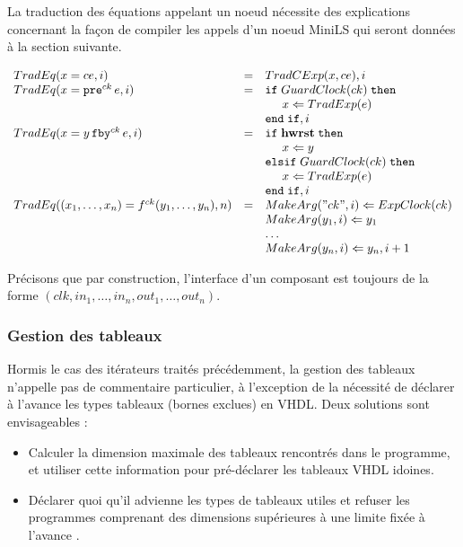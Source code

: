 \documentclass[a4paper]{article}
\newcommand{\mybox}[1]{\mbox{\tt{#1}}}
\newcommand{\ind}[0]{\hspace{0.5cm}}
\newcommand{\Fby}[2]{#1 \, \mybox{fby}^{ck} \, #2}
\newcommand{\Pre}[1]{\mybox{pre}^{ck} \, #1}
\newcommand{\App}[2]{#1^{ck}(#2)}
\newcommand{\Assign}[2]{#1 \Leftarrow #2}
\begin{document}
La traduction des \'equations appelant un noeud n\'ecessite des explications
concernant la fa\c{c}on de compiler les appels d'un noeud MiniLS qui seront donn\'ees
\`a la section suivante.

\newcommand{\TradEq}[2]{TradEq(#1,#2)}
\newcommand{\MA}[2]{MakeArg(#1,#2)}

\[
\begin{array}{lcl}
  \TradEq{x = ce}{i} & = & \TradCE{x}{ce}, i \\

  \TradEq{x = \Pre{e}}{i} & = & \mathtt{if} \; \GEC{ck} \; \mathtt{then} \\
  & & \ind \Assign{x}{\TradE{e}} \\
  & & \mathtt{end} \; \mathtt{if}, i \\

  \TradEq{x = \Fby{y}{e}}{i} & = & \mathtt{if} \; \mathbf{hwrst}
  \; \mathtt{then} \\
  & & \ind \Assign{x}{y} \\
  & & \mathtt{elsif} \; \GEC{ck} \; \mathtt{then} \\
  & & \ind \Assign{x}{\TradE{e}} \\
  & & \mathtt{end} \; \mathtt{if}, i \\


  \TradEq{(x_1,\dots,x_n) = \App{f}{y_1,\dots,y_n}}{n} & = &
  \Assign{\MA{"ck"}{i}}{\EC{ck}} \\
  & & \Assign{\MA{y_1}{i}}{y_1} \\
  & & \dots \\
  & & \Assign{\MA{y_n}{i}}{y_n}, i + 1 \\
\end{array}
\]

Pr\'ecisons que par construction, l'interface d'un composant est toujours de la
forme $(clk, in_1, \dots,in_n, out_1,\dots,out_n)$.

\subsubsection{Gestion des tableaux}

Hormis le cas des it\'erateurs trait\'es pr\'ec\'edemment, la gestion des
tableaux n'appelle pas de commentaire particulier, \`a l'exception de la
n\'ecessit\'e de d\'eclarer \`a l'avance les types tableaux (bornes exclues) en
VHDL. Deux solutions sont envisageables :

\begin{itemize}
\item Calculer la dimension maximale des tableaux rencontr\'es dans le programme,
  et utiliser cette information pour pr\'e-d\'eclarer les tableaux VHDL idoines.
\item D\'eclarer quoi qu'il advienne les types de tableaux utiles et refuser les
  programmes comprenant des dimensions sup\'erieures \`a une limite fix\'ee \`a l'avance
  .
\end{itemize}
\end{document}
